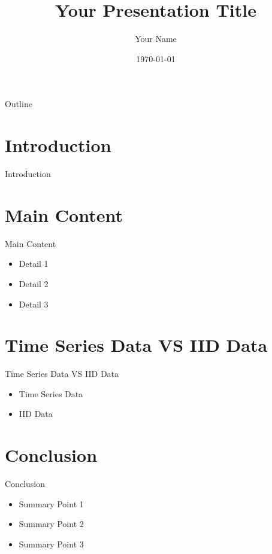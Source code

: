 \documentclass{beamer}
\title{Your Presentation Title}
\author{Your Name}
\date{\today}
\begin{document}
 

\begin{frame}
    \titlepage
\end{frame}

\begin{frame}{Outline}
    \tableofcontents
\end{frame}

\section{Introduction}
\begin{frame}{Introduction}
    
\end{frame}

\section{Main Content}
\begin{frame}{Main Content}
    \begin{itemize}
        \item Detail 1
        \item Detail 2
        \item Detail 3
    \end{itemize}
\end{frame}

\section{Time Series Data VS IID Data}
\begin{frame}{Time Series Data VS IID Data}
    \begin{itemize}
        \item Time Series Data
        \item IID Data
    \end{itemize}
\end{frame}

\section{Conclusion}
\begin{frame}{Conclusion}
    \begin{itemize}
        \item Summary Point 1
        \item Summary Point 2
        \item Summary Point 3
    \end{itemize}
\end{frame}
\end{document}
